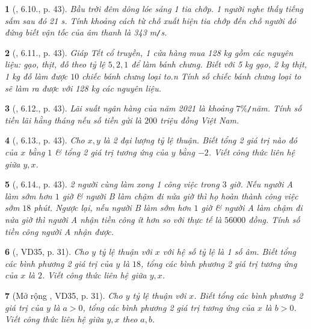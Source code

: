 \documentclass{article}
\newtheorem{baitoan}{}
\begin{document}
\begin{baitoan}[\cite{Binh_boi_duong_Toan_7_tap_1}, 6.10., p. 43]
	Bầu trời đêm dông lóe sáng 1 tia chớp. 1 người nghe thấy tiếng sấm sau đó {\rm21 s}. Tính khoảng cách từ chỗ xuất hiện tia chớp đến chỗ người đó đứng biết vận tốc của âm thanh là {\rm343 m{\tt/}s}.
\end{baitoan}

\begin{baitoan}[\cite{Binh_boi_duong_Toan_7_tap_1}, 6.11., p. 43]
	Giáp Tết cổ truyền, 1 cửa hàng mua {\rm128 kg} gồm các nguyên liệu: gạo, thịt, đỗ theo tỷ lệ $5,2,1$ để làm bánh chưng. Biết với {\rm5 kg} gạo, {\rm2 kg} thịt, {\rm1 kg} đỗ làm được $10$ chiếc bánh chưng loại to.n Tính số chiếc bánh chưng loại to sẽ làm ra được với {\rm128 kg} các nguyên liệu.
\end{baitoan}

\begin{baitoan}[\cite{Binh_boi_duong_Toan_7_tap_1}, 6.12., p. 43]
	Lãi suất ngân hàng của năm 2021 là khoảng $7\%${\tt/}năm. Tính số tiền lãi hằng tháng nếu số tiền gửi là $200$ triệu đồng Việt Nam.
\end{baitoan}

\begin{baitoan}[\cite{Binh_boi_duong_Toan_7_tap_1}, 6.13., p. 43]
	Cho $x,y$ là 2 đại lượng tỷ lệ thuận. Biết tổng 2 giá trị nào đó của $x$ bằng $1$ \& tổng 2 giá trị tương ứng của $y$ bằng $-2$. Viết công thức liên hệ giữa $y,x$.
\end{baitoan}

\begin{baitoan}[\cite{Binh_boi_duong_Toan_7_tap_1}, 6.14., p. 43]
	2 người cùng làm xong 1 công việc trong $3$ giờ. Nếu người A làm sớm hơn $1$ giờ \& người B làm chậm đi nửa giờ thì họ hoàn thành công việc sớm $18$ phút. Ngược lại, nếu người B làm sớm hơn $1$ giờ \& người A làm chậm đi nửa giờ thì người A nhận tiền công ít hơn so với thực tế là $56000$ đồng. Tính số tiền công người A nhận được.
\end{baitoan}

\begin{baitoan}[\cite{Tuyen_Toan_7}, VD35, p. 31]
	Cho $y$ tỷ lệ thuận với $x$ với hệ số tỷ lệ là 1 số âm. Biết tổng các bình phương 2 giá trị của $y$ là $18$, tổng các bình phương 2 giá trị tương ứng của $x$ là $2$. Viết công thức liên hệ giữa $y,x$.
\end{baitoan}

\begin{baitoan}[Mở rộng \cite{Tuyen_Toan_7}, VD35, p. 31]
	Cho $y$ tỷ lệ thuận với $x$. Biết tổng các bình phương 2 giá trị của $y$ là $a > 0$, tổng các bình phương 2 giá trị tương ứng của $x$ là $b > 0$. Viết công thức liên hệ giữa $y,x$ theo $a,b$.
\end{baitoan}
\end{document}
